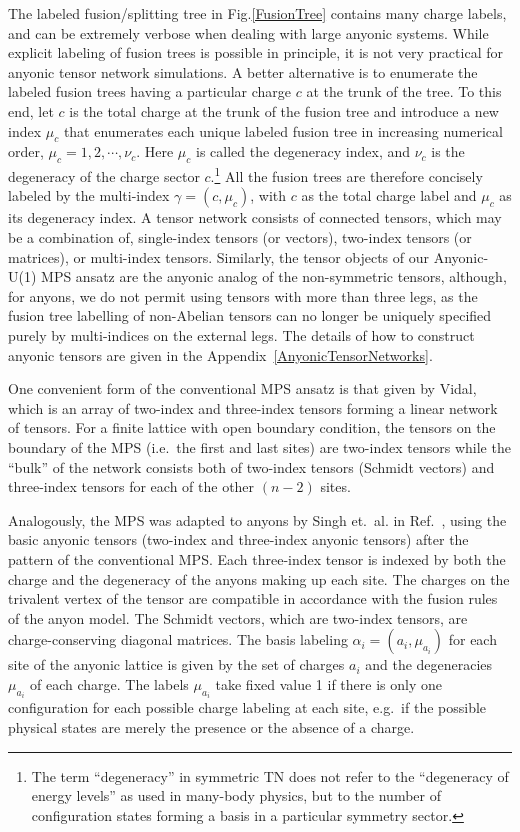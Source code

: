 \documentclass[aps,reprint,superscriptaddress,amsmath,amssymb,amsfonts,prb]{revtex4-1}
\begin{document}
{The labeled fusion/splitting tree in Fig.\ref{FusionTree} contains many charge labels, and can be extremely verbose when dealing with large anyonic systems. While explicit labeling of fusion trees is possible in principle, it is not very practical for anyonic tensor network simulations. A better alternative {is} to enumerate the labeled fusion trees {having} a particular charge $c$ at the trunk of the tree. To this end, let $c$ is the  total charge at the trunk of the fusion tree {and} introduce a new index $\mu_c$ that enumerates each unique labeled fusion tree in increasing numerical order, $\mu_c = 1, 2, \cdots, \nu_c${. H}ere $\mu_c$ is called the degeneracy index, and $\nu_c$ is the degeneracy of the charge sector $c$.\footnote{The term ``degeneracy'' in symmetric TN does not refer to the ``degeneracy of energy levels'' as used in many-body physics, but to the number of configuration {states forming a basis} 
in a particular symmetry sector.}  All the fusion trees are therefore concisely labeled by the multi-index $\gamma=(c, \mu_c)$, with $c$ as the total charge label and $\mu_c$ as its degeneracy index. A tensor network consists of connected tensors, which may be a combination of, single-index tensors (or vectors), two-index tensors (or matrices), or multi-index tensors. Similarly, the tensor objects of our Anyonic-U(1) MPS ansatz are the anyonic analog of the non-symmetric tensors, although, for anyons, we do not permit using tensors with more than three legs, as the {fusion tree labelling of non-Abelian tensors} can no longer be uniquely specified {purely by multi-indices on the external legs}. The details of how to construct anyonic tensors are given in the Appendix~\ref{AnyonicTensorNetworks}}.


One convenient form of the conventional MPS ansatz is that given by Vidal,\cite{Vidal2003} which is an array of two-index and three-index tensors forming a linear network of tensors. For a finite lattice with open boundary condition, the tensors on the boundary of the MPS (i.e.~the first and last sites) are two-index tensors while the ``bulk'' of the network consists both of two-index tensors (Schmidt vectors) and three-index tensors for each of the other $(n-2)$ sites. 

Analogously, the MPS was adapted to anyons by Singh et.~al. in Ref.~, using the basic anyonic tensors (two-index and three-index anyonic tensors) after the pattern of the conventional MPS. Each three-index tensor is indexed by both the charge and the degeneracy of the anyons making up each site. The charges on the trivalent vertex of the tensor are compatible in accordance with the fusion rules of the anyon model. The Schmidt vectors, which are two-index tensors, are charge-conserving diagonal matrices. The basis labeling $\alpha_i=(a_i, \mu_{a_i})$ for each site of the anyonic lattice is given by the set of charges $a_i$ and the degeneracies $\mu_{a_i}$ of each charge. The labels $\mu_{a_i}$ take fixed value 1 if there is only one configuration for each possible charge labeling at each site, e.g.~if the possible physical states are merely the presence or the absence of a charge.
\end{document}
